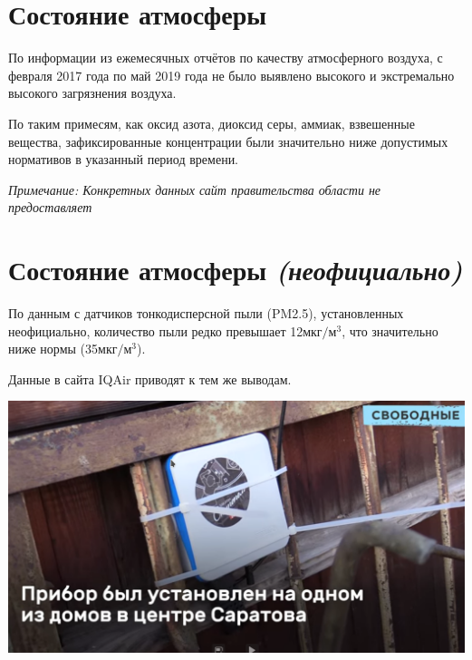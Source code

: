 
\section{Состояние атмосферы}
\begin{frame}{\insertsectionhead}
    \footnotesize
    По информации из ежемесячных отчётов по качеству
    атмосферного воздуха\cite{goveco}, с февраля 2017 года
    по май 2019 года не было выявлено высокого и 
    экстремально высокого загрязнения воздуха.

    \medskip

    По таким примесям, как оксид азота, 
    диоксид серы, аммиак, взвешенные вещества, 
    зафиксированные концентрации были значительно ниже допустимых нормативов
    в указанный период времени. 

    \medskip

    \textit{Примечание: Конкретных данных сайт правительства
    области не предоставляет}
\end{frame}

\section{Состояние атмосферы \textit{(неофициально)}}
\begin{frame}{\insertsectionhead}
    \begin{minipage}{0.55\textwidth}
        По данным с датчиков тонкодисперсной пыли (PM2.5), 
        установленных неофициально, количество пыли 
        редко превышает 12$\text{мкг}/\text{м}^3$,
        что значительно ниже нормы (35$\text{мкг}/\text{м}^3$).

        \medskip

        Данные в сайта IQAir\cite{iqair} приводят к тем же выводам.
    \end{minipage}
    \begin{minipage}{0.40\textwidth}
        \hspace{1em}
        \includegraphics[width=\textwidth]{assets/device.png}
    \end{minipage}
\end{frame}

